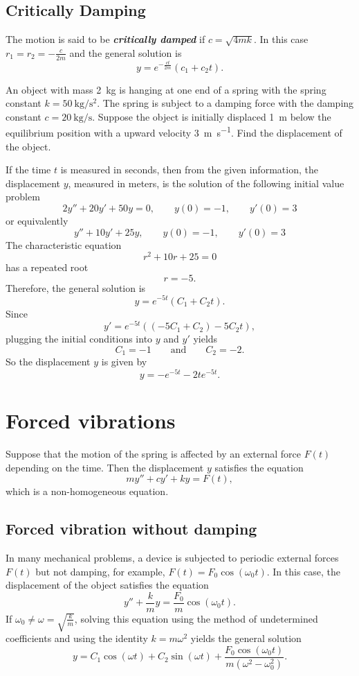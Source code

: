 \subsection*{Critically Damping}
  
The motion is said to be \emph{\textbf{critically damped}} if $c=\sqrt{4mk}$. In this case $r_1=r_2=-\frac{c}{2m}$ and the general solution is
\[y=e^{-\frac{ct}{2m}}(c_1+c_2t).\]

\begin{example} 
An object with mass \SI{2}{\kg} is hanging at one end of a spring with the spring constant $k=\SI{50}{\kg\per\square\second}$. The spring is subject to a damping force with the damping constant $c=\SI{20}{\kg\per\second}$. Suppose the object is initially displaced \SI{1}{\meter} below the equilibrium position with a upward velocity \SI{3}{\meter\per\second}. Find the displacement of the object.
\end{example}
\begin{solution}
If the time $t$ is measured in seconds, then from the given information, the displacement $y$, measured in meters, is the solution of the following initial value problem
\[2y''+ 20y'+50y=0, \qquad y(0)=-1,\qquad y'(0)=3\]
or equivalently
\[y''+10y'+25y, \qquad y(0)=-1,\qquad y'(0)=3\]
The characteristic equation
\[r^2+10r+25=0\]
has a repeated root
\[r=-5.\]
Therefore, the general solution is
\[y=e^{-5t}(C_1+C_2 t).\]
Since
\[y'=e^{-5t}((-5C_1+C_2)-5C_2 t),\]
plugging the initial conditions into $y$ and $y'$ yields
\[C_1=-1\qquad\text{and}\qquad C_2=-2.\]
So the displacement $y$ is given by
\[y=-e^{-5t}-2te^{-5t}.\]
\end{solution}

\section{Forced vibrations}

Suppose that the motion of the spring is affected by an external force $F(t)$ depending on the time. Then the displacement $y$ satisfies the equation
\[my''+cy'+ky=F(t),\]
which is a non-homogeneous equation. 

\subsection*{Forced vibration without damping}

In many mechanical problems, a device is subjected to periodic external forces $F(t)$ but not damping, for example, $F(t)=F_0\cos(\omega_0t)$. In this case, the displacement of the object satisfies the equation
\[y''+\frac{k}{m}y=\frac{F_0}{m}\cos(\omega_0t).\]
If $\omega_0\neq \omega=\sqrt{\frac{k}{m}}$, solving this equation using the method of undetermined coefficients and using the identity $k=m\omega^2$ yields the general solution
\[y=C_1\cos(\omega t)+C_2\sin(\omega t)+\frac{F_0\cos(\omega_0 t)}{m(\omega^2-\omega_0^2)}.\] 

